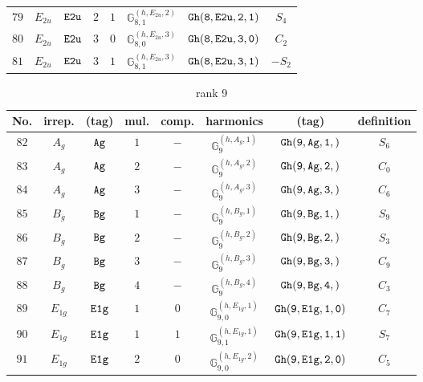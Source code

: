 \documentclass[fleqn,8pt]{jsarticle}
\begin{document}
\begin{table}[ht!]
\begin{center}
\begin{tabular}{cccccccc}
$ 79 $ & $ E_{2u} $ & $ {\tt E2u} $ & $ 2 $ & $ 1 $ & $ \mathbb{G}_{8,1}^{(h,E_{2u},2)} $ & $ {\tt Gh(8,E2u,2,1)} $ & $ S_{4} $ \\
$ 80 $ & $ E_{2u} $ & $ {\tt E2u} $ & $ 3 $ & $ 0 $ & $ \mathbb{G}_{8,0}^{(h,E_{2u},3)} $ & $ {\tt Gh(8,E2u,3,0)} $ & $ C_{2} $ \\
$ 81 $ & $ E_{2u} $ & $ {\tt E2u} $ & $ 3 $ & $ 1 $ & $ \mathbb{G}_{8,1}^{(h,E_{2u},3)} $ & $ {\tt Gh(8,E2u,3,1)} $ & $ - S_{2} $ \\
 \hline \hline
\end{tabular}
\end{center}
\end{table}
\begin{table}[ht!]
\begin{center}
\caption{rank 9}
\renewcommand{\arraystretch}{1.3}
\begin{tabular}{cccccccc} \hline \hline
No. & irrep. & (tag) & mul. & comp. & harmonics & (tag) & definition \\ \hline
$ 82 $ & $ A_{g} $ & $ {\tt Ag} $ & $ 1 $ & $ - $ & $ \mathbb{G}_{9}^{(h,A_{g},1)} $ & $ {\tt Gh(9,Ag,1,)} $ & $ S_{6} $ \\
$ 83 $ & $ A_{g} $ & $ {\tt Ag} $ & $ 2 $ & $ - $ & $ \mathbb{G}_{9}^{(h,A_{g},2)} $ & $ {\tt Gh(9,Ag,2,)} $ & $ C_{0} $ \\
$ 84 $ & $ A_{g} $ & $ {\tt Ag} $ & $ 3 $ & $ - $ & $ \mathbb{G}_{9}^{(h,A_{g},3)} $ & $ {\tt Gh(9,Ag,3,)} $ & $ C_{6} $ \\
$ 85 $ & $ B_{g} $ & $ {\tt Bg} $ & $ 1 $ & $ - $ & $ \mathbb{G}_{9}^{(h,B_{g},1)} $ & $ {\tt Gh(9,Bg,1,)} $ & $ S_{9} $ \\
$ 86 $ & $ B_{g} $ & $ {\tt Bg} $ & $ 2 $ & $ - $ & $ \mathbb{G}_{9}^{(h,B_{g},2)} $ & $ {\tt Gh(9,Bg,2,)} $ & $ S_{3} $ \\
$ 87 $ & $ B_{g} $ & $ {\tt Bg} $ & $ 3 $ & $ - $ & $ \mathbb{G}_{9}^{(h,B_{g},3)} $ & $ {\tt Gh(9,Bg,3,)} $ & $ C_{9} $ \\
$ 88 $ & $ B_{g} $ & $ {\tt Bg} $ & $ 4 $ & $ - $ & $ \mathbb{G}_{9}^{(h,B_{g},4)} $ & $ {\tt Gh(9,Bg,4,)} $ & $ C_{3} $ \\
$ 89 $ & $ E_{1g} $ & $ {\tt E1g} $ & $ 1 $ & $ 0 $ & $ \mathbb{G}_{9,0}^{(h,E_{1g},1)} $ & $ {\tt Gh(9,E1g,1,0)} $ & $ C_{7} $ \\
$ 90 $ & $ E_{1g} $ & $ {\tt E1g} $ & $ 1 $ & $ 1 $ & $ \mathbb{G}_{9,1}^{(h,E_{1g},1)} $ & $ {\tt Gh(9,E1g,1,1)} $ & $ S_{7} $ \\
$ 91 $ & $ E_{1g} $ & $ {\tt E1g} $ & $ 2 $ & $ 0 $ & $ \mathbb{G}_{9,0}^{(h,E_{1g},2)} $ & $ {\tt Gh(9,E1g,2,0)} $ & $ C_{5} $ \\

\end{tabular}
\end{center}
\end{table}
\end{document}
